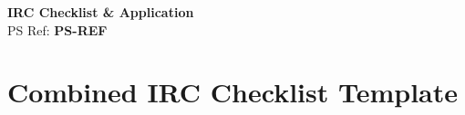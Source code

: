 \documentclass[11pt,a4paper]{article}
\begin{document}
\small


\begin{center}
{\Large \textbf{IRC Checklist \& Application}}\\[4pt]
{\normalsize PS Ref: \textbf{PS-REF}}
\end{center}

\vspace{8pt}

\section*{Combined IRC Checklist Template}
\vspace{-2pt}
\end{document}
